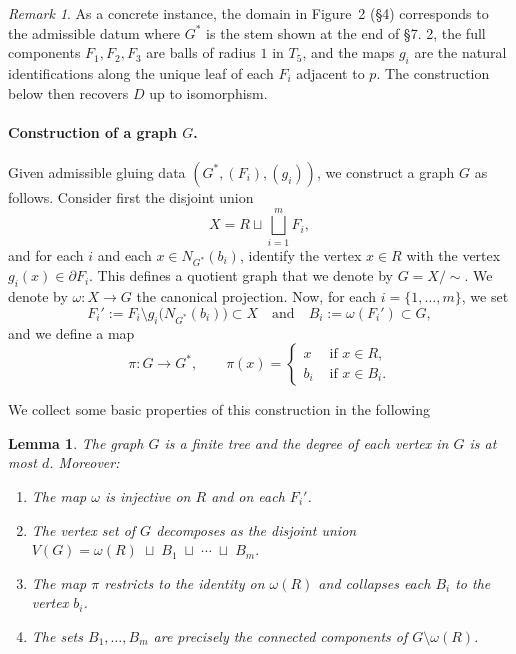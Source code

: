 \documentclass[a4paper, 11pt]{article}
\numberwithin{equation}{section}
\newtheorem{lemma}[theorem]{Lemma}
\theoremstyle{definition}
\theoremstyle{remark}
\newtheorem{remark}[theorem]{Remark}
\begin{document}
\medskip

\begin{remark}
As a concrete instance, the domain in Figure~2 (\S 4) corresponds to the admissible datum where $G^*$ is the stem shown at the end of \S 7. 2, the full 
components  $F_1, F_2, F_3$ are balls of radius $1$ in $T_5$, and the maps $g_i$ are the natural identifications along the unique 
leaf of each $F_i$ adjacent to $p$. The construction below then recovers $D$ up to isomorphism.
\end{remark}

\medskip

\paragraph{\textbf{Construction of a graph $G$.}}
Given admissible gluing data $(G^*,(F_i),(g_i))$, we construct a graph $G$ as follows. Consider first the disjoint union
\[
X = R \sqcup \bigsqcup_{i=1}^m F_i,
\]
and for each $i$ and each $x\in N_{G^*}(b_i)$, identify the vertex $x\in R$ with the vertex $g_i(x)\in \partial F_i$.
This defines a quotient graph that we denote by $G = X/\sim$. We denote by $\omega : X \rightarrow G$ the canonical projection. 
Now, for each $i = \{1, \dots, m\}$, we set
\[
  F_i' := F_i \setminus g_i\!\bigl(N_{G^*}(b_i)\bigr) \subset X  \quad\text{and}\quad  B_i := \omega(F_i')\subset G,
\]
and we define a map 
\begin{equation}\label{def.mappi}
  \pi : G \rightarrow G^*,  \qquad  \pi(x) = \begin{cases} x & \text{ if }  x\in R, \\ 
   b_i & \text{ if }  x\in B_i. \end{cases}
\end{equation}

We collect some basic properties of this construction in the following 
\begin{lemma}\label{lem:G-is-tree}
The graph $G$ is a finite tree and the degree of each vertex in $G$ is at most $d$.
Moreover:
\begin{enumerate}[\hspace{0.3cm} (a)]
\item The map $\omega$ is injective on $R$ and on each $F_i'$.
\item The vertex set of $G$ decomposes as the disjoint union $V(G)=\omega(R)\;\sqcup\; B_1 \;\sqcup\; \cdots \;\sqcup\; B_m.$
\item The map $\pi$ restricts to the identity on $\omega(R)$ and collapses each $B_i$ to the vertex $b_i$.
\item The sets $B_1,\dots,B_m$ are precisely the connected components of $G\setminus \omega(R)$.
\end{enumerate}
\end{lemma}
\end{document}
